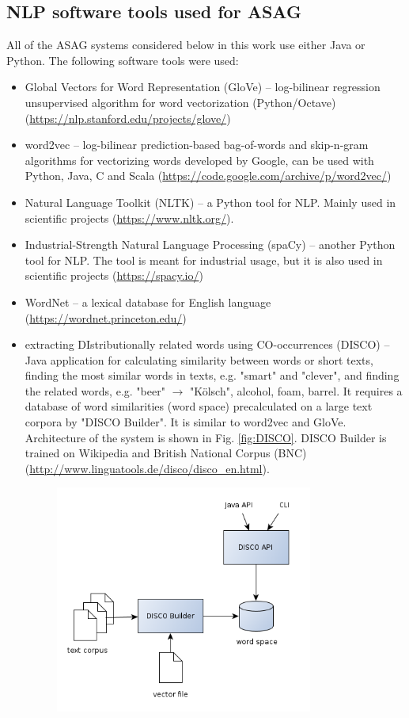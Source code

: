 \subsection{NLP software tools used for ASAG}

All of the ASAG systems considered below in this work use either Java or Python. The following software tools were used:

\begin{itemize}
\item Global Vectors for Word Representation (GloVe) -- log-bilinear regression unsupervised algorithm for word vectorization (Python/Octave) (\url{https://nlp.stanford.edu/projects/glove/})
\item word2vec -- log-bilinear prediction-based bag-of-words and skip-n-gram algorithms for vectorizing words developed by Google, can be used with Python, Java, C and Scala (\url{https://code.google.com/archive/p/word2vec/})
\item Natural Language Toolkit (NLTK) -- a Python tool for NLP. Mainly used in scientific projects (\url{https://www.nltk.org/}).
\item Industrial-Strength Natural Language Processing (spaCy) -- another Python tool for NLP. The tool is meant for industrial usage, but it is also used in scientific projects (\url{https://spacy.io/})
\item WordNet -- a lexical database for English language (\url{https://wordnet.princeton.edu/})
\item extracting DIstributionally related words using CO-occurrences (DISCO) -- Java application for calculating similarity between words or short texts, finding the most similar words in texts, e.g. "smart" and "clever", and finding the related words, e.g. "beer" $\rightarrow$ "K\"olsch", alcohol, foam, barrel. It requires a database of word similarities (word space) precalculated on a large text corpora by "DISCO Builder". It is similar to word2vec and GloVe. Architecture of the system is shown in Fig. \ref{fig:DISCO}. DISCO Builder is trained on Wikipedia and British National Corpus (BNC) (\url{http://www.linguatools.de/disco/disco_en.html}). 
\begin{figure}[h!]
  \centering
  \includegraphics[width=0.8\textwidth]{img/DISCO}

\end{figure}
\end{itemize}

